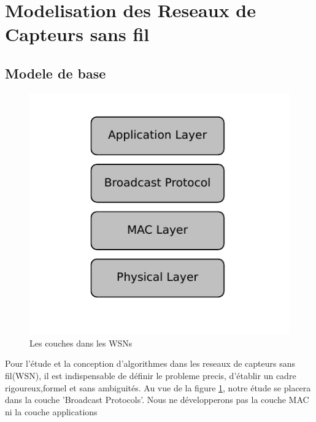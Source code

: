 
\pagestyle{plain} 	%

\setcounter{tocdepth}{4}     %


\section{Modelisation des Reseaux de Capteurs sans fil}

\subsection{Modele de base}

\begin{figure}[h]
\centering
\includegraphics[scale=0.9]{Etat_de_l'art/source/layer.pdf}
\caption{\label{Layer} Les couches dans les WSNs}
\end{figure}

Pour l'étude et la conception d'algorithmes dans les reseaux de capteurs sans fil(WSN), il est indispensable de définir le probleme precis, d'établir un cadre rigoureux,formel et sans ambiguités. Au vue de la figure \ref{Layer}, notre étude se 
placera dans la couche 'Broadcast Protocols'. Nous ne développerons pas la couche MAC ni la couche applications\\

